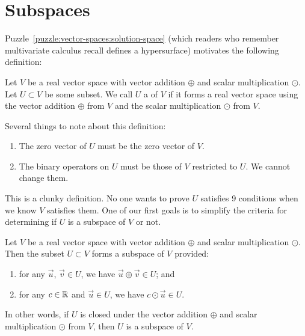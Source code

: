 \section{Subspaces}

\M
Puzzle~\ref{puzzle:vector-spaces:solution-space} (which readers who
remember multivariate calculus recall defines a hypersurface) motivates the
following definition:

\begin{definition}
Let $V$ be a real vector space with vector addition $\oplus$ and scalar
multiplication $\odot$.
Let $U\subset V$ be some subset. We call $U$ a  of $V$
if
it forms a real vector space using
the vector addition $\oplus$ from $V$ and the scalar multiplication $\odot$ from $V$.
\end{definition}

\begin{remark}
  Several things to note about this definition:
  \begin{enumerate}
  \item The zero vector of $U$ must be the zero vector of $V$.
  \item The binary operators on $U$ must be those of $V$ restricted to
    $U$. We cannot change them.
  \end{enumerate}
\end{remark}

\begin{remark}
This is a clunky definition. No one wants to prove $U$ satisfies 9
conditions when we know $V$ satisfies them. One of our first goals is to
simplify the criteria for determining if $U$ is a subspace of $V$ or not.
\end{remark}

\begin{theorem}\label{thm:subspaces:subset-closed-under-linear-combos-is-a-subspace}
Let $V$ be a real vector space with vector addition $\oplus$ and scalar
multiplication $\odot$. Then the subset $U\subset V$ forms a subspace of
$V$ provided:
\begin{enumerate}
\item for any $\vec{u}$, $\vec{v}\in U$, we have
  $\vec{u}\oplus\vec{v}\in U$; and
\item for any $c\in\mathbb{R}$ and $\vec{u}\in U$, we have $c\odot\vec{u}\in U$.
\end{enumerate}
\end{theorem}

In other words, if $U$ is closed under the vector addition
$\oplus$ and scalar multiplication $\odot$ from $V$, then $U$ is a
subspace of $V$.

